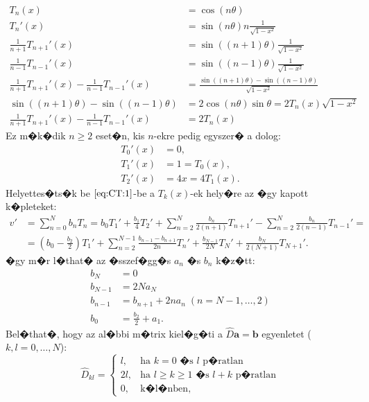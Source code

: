 \begin{align*}
T_n (x) &= \cos(n \theta) \\
T_n' (x) &= \sin(n \theta) n \frac{1}{\sqrt{1 - x^2}} \\
\frac{1}{n+1} T_{n+1}' (x) &= \sin((n+1) \theta) \frac{1}{\sqrt{1 - x^2}} \\
\frac{1}{n-1} T_{n-1}' (x) &= \sin((n-1) \theta) \frac{1}{\sqrt{1 - x^2}} \\
\frac{1}{n+1} T_{n+1}' (x) - \frac{1}{n-1} T_{n-1}' (x) &= \frac{\sin((n+1) \theta) - \sin((n-1) \theta)}{\sqrt{1 - x^2}} \\
\sin((n+1) \theta) - \sin((n-1) \theta) &= 2 \cos(n \theta) \sin\theta = 2 T_n(x) \sqrt{1 - x^2} \\
\frac{1}{n+1} T_{n+1}' (x) - \frac{1}{n-1} T_{n-1}' (x) &= 2 T_n(x)
\end{align*}
Ez m�k�dik $n \geq 2$ eset�n, kis $n$-ekre pedig egyszer� a dolog:
\begin{align*}
T_0' (x) &= 0, \\
T_1' (x) &= 1 = T_0(x), \\
T_2' (x) &= 4x = 4 T_1(x).
\end{align*}
Helyettes�ts�k be $\eqref{eq:CT:1}$-be a $T_k(x)$-ek hely�re az �gy kapott k�pleteket:
\begin{align*}
v' &= \sum_{n = 0}^N b_n T_n = b_0 T_1' + \frac{b_1}{4} T_2' + \sum_{n=2}^N \frac{b_n}{2(n+1)} T_{n+1}' - \sum_{n=2}^N \frac{b_n}{2(n-1)} T_{n-1}' = \\
 &= \left( b_0 - \frac{b_2}{2} \right) T_1' + \sum_{n=2}^{N - 1} \frac{b_{n-1} - b_{n+1}}{2n} T_n' + \frac{b_{N-1}}{2N} T_N' + \frac{b_N}{2(N+1)}T_{N+1}'.
\end{align*}
�gy m�r l�that� az �sszef�gg�s $a_n$ �s $b_n$ k�z�tt:
\begin{align*}
b_N &= 0 \\
b_{N-1} &= 2N a_N \\
b_{n-1} &= b_{n+1} + 2n a_n \;(n = N-1, \dots, 2) \\
b_0 &= \frac{b_2}{2} + a_1.
\end{align*}
Bel�that�, hogy az al�bbi m�trix kiel�g�ti a $\hat{D} \mathbf{a} = \mathbf{b}$ egyenletet ($k, l = 0, \dots, N$):
\begin{equation*}
\hat{D}_{kl} =
	\begin{cases}
	l, &\text{ha } k = 0 \text{ �s } l \text{ p�ratlan} \\
	2l, &\text{ha } l \geq k \geq 1 \text{ �s } l+k \text{ p�ratlan} \\
	0, &\text{k�l�nben},
	\end{cases}
\end{equation*}
